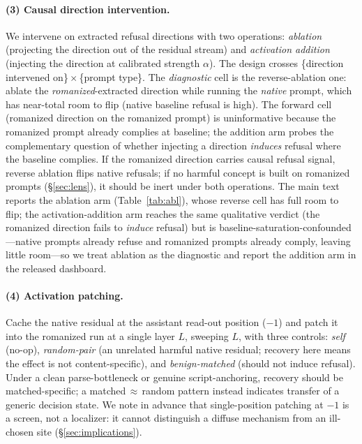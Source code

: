 \documentclass[11pt]{article}
\begin{document}
\paragraph{(3) Causal direction intervention.} We intervene on extracted refusal directions with two operations: \emph{ablation} (projecting the direction out of the residual stream) and \emph{activation addition} (injecting the direction at calibrated strength $\alpha$). The design crosses \{direction intervened on\}\,$\times$\,\{prompt type\}. The \emph{diagnostic} cell is the reverse-ablation one: ablate the \emph{romanized}-extracted direction while running the \emph{native} prompt, which has near-total room to flip (native baseline refusal is high). The forward cell (romanized direction on the romanized prompt) is uninformative because the romanized prompt already complies at baseline; the addition arm probes the complementary question of whether injecting a direction \emph{induces} refusal where the baseline complies. If the romanized direction carries causal refusal signal, reverse ablation flips native refusals; if no harmful concept is built on romanized prompts (\S\ref{sec:lens}), it should be inert under both operations. The main text reports the ablation arm (Table~\ref{tab:abl}), whose reverse cell has full room to flip; the activation-addition arm reaches the same qualitative verdict (the romanized direction fails to \emph{induce} refusal) but is baseline-saturation-confounded---native prompts already refuse and romanized prompts already comply, leaving little room---so we treat ablation as the diagnostic and report the addition arm in the released dashboard.

\paragraph{(4) Activation patching.} Cache the native residual at the assistant read-out position ($-1$) and patch it into the romanized run at a single layer $L$, sweeping $L$, with three controls: \emph{self} (no-op), \emph{random-pair} (an unrelated harmful native residual; recovery here means the effect is not content-specific), and \emph{benign-matched} (should not induce refusal). Under a clean parse-bottleneck or genuine script-anchoring, recovery should be matched-specific; a matched\,$\approx$\,random pattern instead indicates transfer of a generic decision state. We note in advance that single-position patching at $-1$ is a screen, not a localizer: it cannot distinguish a diffuse mechanism from an ill-chosen site (\S\ref{sec:implications}).
\end{document}
